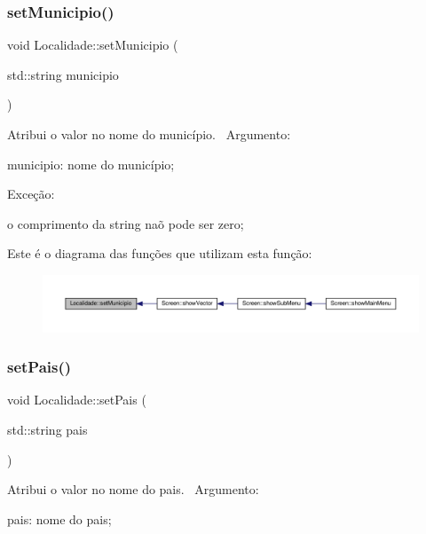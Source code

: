 \subsubsection{\texorpdfstring{set\+Municipio()}{setMunicipio()}}
{\footnotesize\ttfamily void Localidade\+::set\+Municipio (\begin{DoxyParamCaption}\item[{std\+::string}]{municipio }\end{DoxyParamCaption})}

Atribui o valor no nome do município.~\newline
 Argumento\+:
\begin{DoxyItemize}
\item municipio\+: nome do município;
\end{DoxyItemize}

Exceção\+:
\begin{DoxyItemize}
\item o comprimento da string naõ pode ser zero;
\end{DoxyItemize}Este é o diagrama das funções que utilizam esta função\+:\nopagebreak
\begin{figure}[H]
\begin{center}
\leavevmode
\includegraphics[width=350pt]{classLocalidade_a90ac71109a4954863bb045a57e3fc29d_icgraph}
\end{center}
\end{figure}
\mbox{\label{classLocalidade_af8e89f3bdcf8dd7bb1f3f74fdc8bc119}} 
\subsubsection{\texorpdfstring{set\+Pais()}{setPais()}}
{\footnotesize\ttfamily void Localidade\+::set\+Pais (\begin{DoxyParamCaption}\item[{std\+::string}]{pais }\end{DoxyParamCaption})}

Atribui o valor no nome do pais.~\newline
 Argumento\+:
\begin{DoxyItemize}
\item pais\+: nome do pais;
\end{DoxyItemize}

